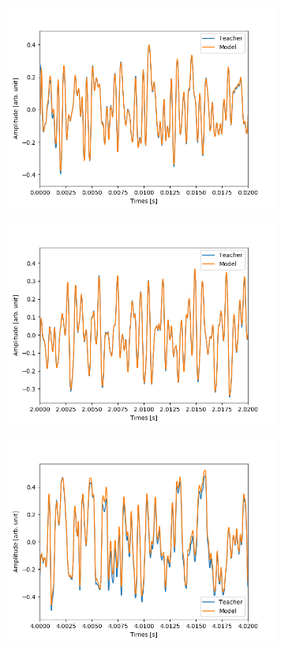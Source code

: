 \documentclass{jreport}		%
\begin{document}
\newpage
\begin{figure}[htbp]
 \begin{minipage}{0.5\hsize}
 \begin{center}
  \includegraphics[width=90mm]{gain10_output_hikaku.png}
 \end{center}
 \label{fig:one}
 \end{minipage}
 \begin{minipage}{0.5\hsize}
 \begin{center}
  \includegraphics[width=90mm]{gain10_output_hikaku2.png}
 \end{center}
 \label{fig:two}
 \end{minipage}
 \begin{minipage}{0.5\hsize}
 \begin{center}
  \includegraphics[width=90mm]{gain10_output_hikaku3.png}

\end{center}
\end{minipage}
\end{figure}
\end{document}

